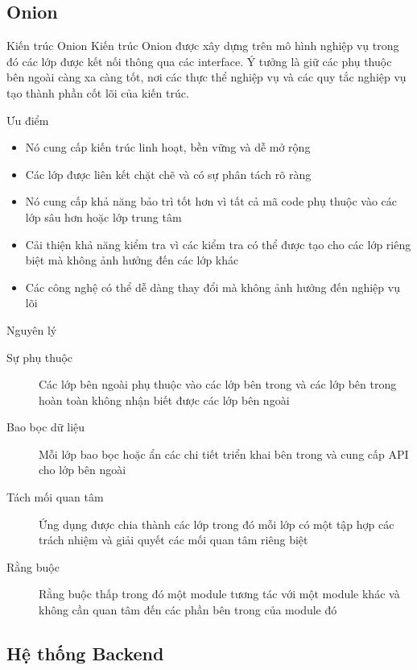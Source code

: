 \subsection{Onion}

\begin{frame}{Kiến trúc Onion}
	Kiến trúc Onion được xây dựng trên mô hình nghiệp vụ trong đó các lớp được kết nối thông qua các interface. Ý tưởng là giữ các phụ thuộc bên ngoài càng xa càng tốt, nơi các thực thể nghiệp vụ và các quy tắc nghiệp vụ tạo thành phần cốt lõi của kiến trúc.
\end{frame}

\begin{frame}{Ưu điểm}
	\begin{itemize}
		\item Nó cung cấp kiến trúc linh hoạt, bền vững và dễ mở rộng
		\item Các lớp được liên kết chặt chẽ và có sự phân tách rõ ràng
		\item Nó cung cấp khả năng bảo trì tốt hơn vì tất cả mã code phụ thuộc vào các lớp sâu hơn hoặc lớp trung tâm
		\item Cải thiện khả năng kiểm tra vì các kiểm tra có thể được tạo cho các lớp riêng biệt mà không ảnh hưởng đến các lớp khác
		\item Các công nghệ có thể dễ dàng thay đổi mà không ảnh hưởng đến nghiệp vụ lõi
	\end{itemize}
\end{frame}

\begin{frame}{Nguyên lý}
	\begin{description}
		\item[Sự phụ thuộc] Các lớp bên ngoài phụ thuộc vào các lớp bên trong và các lớp bên trong hoàn toàn không nhận biết được các lớp bên ngoài
		\item[Bao bọc dữ liệu] Mỗi lớp bao bọc hoặc ẩn các chi tiết triển khai bên trong và cung cấp API cho lớp bên ngoài
		\item[Tách mối quan tâm] Ứng dụng được chia thành các lớp trong đó mỗi lớp có một tập hợp các trách nhiệm và giải quyết các mối quan tâm riêng biệt
		\item[Rằng buộc] Rằng buộc thấp trong đó một module tương tác với một module khác và không cần quan tâm đến các phần bên trong của module đó
	\end{description}
\end{frame}

\subsection{Hệ thống Backend}

